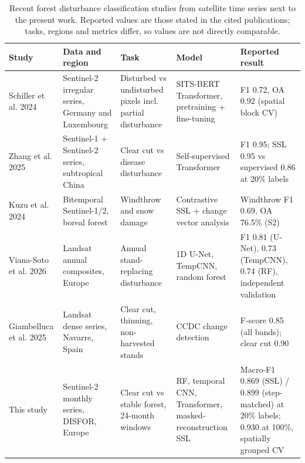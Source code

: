 \documentclass[10pt,a4paper,twocolumn]{article}
\begin{document}
\begin{table}[tbp]
\centering
\footnotesize
\caption{Recent forest disturbance classification studies from satellite time series next to the present work. Reported values are those stated in the cited publications; tasks, regions and metrics differ, so values are not directly comparable.}
\begin{tabular}{p{2.6cm}p{3.4cm}p{3.2cm}p{3.2cm}p{3.6cm}}
\toprule
Study & Data and region & Task & Model & Reported result \\ \midrule
Schiller et al. 2024 \cite{ref27} & Sentinel-2 irregular series, Germany and Luxembourg & Disturbed vs undisturbed pixels incl. partial disturbance & SITS-BERT Transformer, pretraining + fine-tuning & F1 0.72, OA 0.92 (spatial block CV) \\
Zhang et al. 2025 \cite{ref2} & Sentinel-1 + Sentinel-2 series, subtropical China & Clear cut vs disease disturbance & Self-supervised Transformer & F1 0.95; SSL 0.95 vs supervised 0.86 at 20\% labels \\
Kuzu et al. 2024 \cite{ref29} & Bitemporal Sentinel-1/2, boreal forest & Windthrow and snow damage & Contrastive SSL + change vector analysis & Windthrow F1 0.69, OA 76.5\% (S2) \\
Viana-Soto et al. 2026 \cite{ref28} & Landsat annual composites, Europe & Annual stand-replacing disturbance & 1D U-Net, TempCNN, random forest & F1 0.81 (U-Net), 0.73 (TempCNN), 0.74 (RF), independent validation \\
Giambelluca et al. 2025 \cite{ref30} & Landsat dense series, Navarre, Spain & Clear cut, thinning, non-harvested stands & CCDC change detection & F-score 0.85 (all bands); clear cut 0.90 \\
This study & Sentinel-2 monthly series, DISFOR, Europe & Clear cut vs stable forest, 24-month windows & RF, temporal CNN, Transformer, masked-reconstruction SSL & Macro-F1 0.869 (SSL) / 0.899 (step-matched) at 20\% labels; 0.930 at 100\%, spatially grouped CV \\
\bottomrule
\end{tabular}
\end{table}
\end{document}
